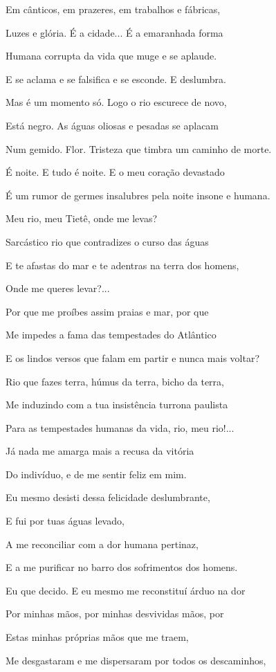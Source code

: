 Em cânticos, em prazeres, em trabalhos e fábricas,

Luzes e glória. É a cidade... É a emaranhada forma

Humana corrupta da vida que muge e se aplaude.

E se aclama e se falsifica e se esconde. E deslumbra.

Mas é um momento só. Logo o rio escurece de novo,

Está negro. As águas oliosas e pesadas se aplacam

Num gemido. Flor. Tristeza que timbra um caminho de morte.

É noite. E tudo é noite. E o meu coração devastado

É um rumor de germes insalubres pela noite insone e humana.

Meu rio, meu Tietê, onde me levas?

Sarcástico rio que contradizes o curso das águas

E te afastas do mar e te adentras na terra dos homens,

Onde me queres levar?...

Por que me proíbes assim praias e mar, por que

Me impedes a fama das tempestades do Atlântico

E os lindos versos que falam em partir e nunca mais voltar?

Rio que fazes terra, húmus da terra, bicho da terra,

Me induzindo com a tua insistência turrona paulista

Para as tempestades humanas da vida, rio, meu rio!...

Já nada me amarga mais a recusa da vitória

Do indivíduo, e de me sentir feliz em mim.

Eu mesmo desisti dessa felicidade deslumbrante,

E fui por tuas águas levado,

A me reconciliar com a dor humana pertinaz,

E a me purificar no barro dos sofrimentos dos homens.

Eu que decido. E eu mesmo me reconstituí árduo na dor

Por minhas mãos, por minhas desvividas mãos, por

Estas minhas próprias mãos que me traem,

Me desgastaram e me dispersaram por todos os descaminhos,

